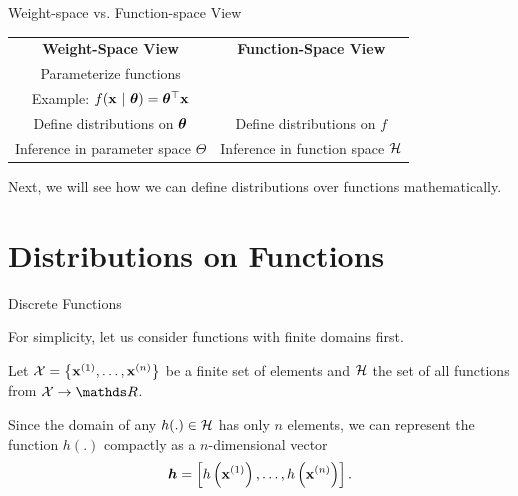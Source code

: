 \documentclass[11pt,compress,t,notes=noshow, xcolor=table]{beamer}
\begin{document}
\begin{frame}{Weight-space vs. Function-space View}

\begin{table}
  \begin{tabular}{cc}
  \textbf{Weight-Space View} & \textbf{Function-Space View} \vspace{4mm}\\ 
  Parameterize functions & \vspace{1mm}\\
  \footnotesize Example: $f(\mathbf{x} ~|~ \bm{\theta}) = \bm{\theta}^\top \mathbf{x}$ & \vspace{3mm}\\
  Define distributions on $\bm{\theta}$ & Define distributions on $f$ \vspace{4mm}\\
  Inference in parameter space $\Theta$ & Inference in function space $\mathcal{H}$
  \end{tabular}
\end{table}  

\lz

Next, we will see how we can define distributions over functions mathematically. 


\end{frame}

\section{Distributions on Functions}

\begin{vbframe}{Discrete Functions}

For simplicity, let us consider functions with finite domains first. 

\lz 


Let $\mathcal{X} = \left\{\mathbf{x}^{(1)}, \dots , \mathbf{x}^{(n)}\right\}$ be a finite set of elements and $\mathcal{H}$ the set of all functions from $\mathcal{X} \to \R$.

\lz

Since the domain of any $h(.) \in \mathcal{H}$ has only $n$ elements, we can represent the function $h(.)$ compactly as a $n$-dimensional vector $$\bm{h} = \left[h\left(\mathbf{x}^{(1)}\right), \dots, h\left(\mathbf{x}^{(n)}\right)\right].$$
\end{vbframe}


\end{document}
